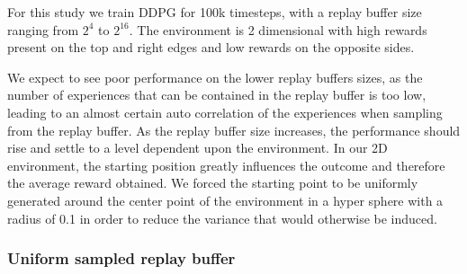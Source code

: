 \documentclass{article}
\begin{document}
For this study we train DDPG for 100k timesteps, with a replay buffer size ranging from ${2}^{4}$ to ${2}^{16}$. The environment is 2 dimensional with high rewards present on the top and right edges and low rewards on the opposite sides.

We expect to see poor performance on the lower replay buffers sizes, as the number of experiences that can be contained in the replay buffer is too low, leading to an almost certain auto correlation of the experiences when sampling from the replay buffer. As the replay buffer size increases, the performance should rise and settle to a level dependent upon the environment. In our 2D environment, the starting position greatly influences the outcome and therefore the average reward obtained. We forced the starting point to be uniformly generated around the center point of the environment in a hyper sphere with a radius of 0.1 in order to reduce the variance that would otherwise be induced.


\subsubsection{Uniform sampled replay buffer}
\end{document}
